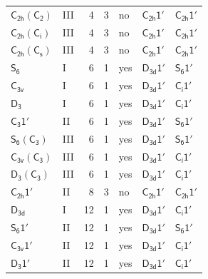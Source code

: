 \documentclass[10pt,a4paper]{article}
\numberwithin{equation}{section}
\newcommand{\grp}[1]{\mathsf{#1}}
\begin{document}
{\begin{longtable}{@{}llrrlll@{}}
\href{C2h-C2.pdf}{$\grp{C_{2h}}(\grp{C_{2}})$} & III & 4 & 3 & no & \href{C2h-1p.pdf}{$\grp{C_{2h}1'}$} & \href{C2h-1p.pdf}{$\grp{C_{2h}1'}$}\\
\href{C2h-S2.pdf}{$\grp{C_{2h}}(\grp{C_{i}})$} & III & 4 & 3 & no & \href{C2h-1p.pdf}{$\grp{C_{2h}1'}$} & \href{C2h-1p.pdf}{$\grp{C_{2h}1'}$}\\
\href{C2h-C1v.pdf}{$\grp{C_{2h}}(\grp{C_{s}})$} & III & 4 & 3 & no & \href{C2h-1p.pdf}{$\grp{C_{2h}1'}$} & \href{C2h-1p.pdf}{$\grp{C_{2h}1'}$}\\
\href{../../../rotation/data/pdf/S6.pdf}{$\grp{S_{6}}$} & I & 6 & 1 & yes & \href{D3d-1p.pdf}{$\grp{D_{3d}1'}$} & \href{S6-1p.pdf}{$\grp{S_{6}1'}$}\\
\href{../../../rotation/data/pdf/C3v.pdf}{$\grp{C_{3v}}$} & I & 6 & 1 & yes & \href{D3d-1p.pdf}{$\grp{D_{3d}1'}$} & \href{S2-1p.pdf}{$\grp{C_{i}1'}$}\\
\href{../../../rotation/data/pdf/D3.pdf}{$\grp{D_{3}}$} & I & 6 & 1 & yes & \href{D3d-1p.pdf}{$\grp{D_{3d}1'}$} & \href{S2-1p.pdf}{$\grp{C_{i}1'}$}\\
\href{C3-1p.pdf}{$\grp{C_{3}1'}$} & II & 6 & 1 & yes & \href{D3d-1p.pdf}{$\grp{D_{3d}1'}$} & \href{S6-1p.pdf}{$\grp{S_{6}1'}$}\\
\href{S6-C3.pdf}{$\grp{S_{6}}(\grp{C_{3}})$} & III & 6 & 1 & yes & \href{D3d-1p.pdf}{$\grp{D_{3d}1'}$} & \href{S6-1p.pdf}{$\grp{S_{6}1'}$}\\
\href{C3v-C3.pdf}{$\grp{C_{3v}}(\grp{C_{3}})$} & III & 6 & 1 & yes & \href{D3d-1p.pdf}{$\grp{D_{3d}1'}$} & \href{S2-1p.pdf}{$\grp{C_{i}1'}$}\\
\href{D3-C3.pdf}{$\grp{D_{3}}(\grp{C_{3}})$} & III & 6 & 1 & yes & \href{D3d-1p.pdf}{$\grp{D_{3d}1'}$} & \href{S2-1p.pdf}{$\grp{C_{i}1'}$}\\
\href{C2h-1p.pdf}{$\grp{C_{2h}1'}$} & II & 8 & 3 & no & \href{C2h-1p.pdf}{$\grp{C_{2h}1'}$} & \href{C2h-1p.pdf}{$\grp{C_{2h}1'}$}\\
\href{../../../rotation/data/pdf/D3d.pdf}{$\grp{D_{3d}}$} & I & 12 & 1 & yes & \href{D3d-1p.pdf}{$\grp{D_{3d}1'}$} & \href{S2-1p.pdf}{$\grp{C_{i}1'}$}\\
\href{S6-1p.pdf}{$\grp{S_{6}1'}$} & II & 12 & 1 & yes & \href{D3d-1p.pdf}{$\grp{D_{3d}1'}$} & \href{S6-1p.pdf}{$\grp{S_{6}1'}$}\\
\href{C3v-1p.pdf}{$\grp{C_{3v}1'}$} & II & 12 & 1 & yes & \href{D3d-1p.pdf}{$\grp{D_{3d}1'}$} & \href{S2-1p.pdf}{$\grp{C_{i}1'}$}\\
\href{D3-1p.pdf}{$\grp{D_{3}1'}$} & II & 12 & 1 & yes & \href{D3d-1p.pdf}{$\grp{D_{3d}1'}$} & \href{S2-1p.pdf}{$\grp{C_{i}1'}$}\\

\end{longtable}}
\end{document}
